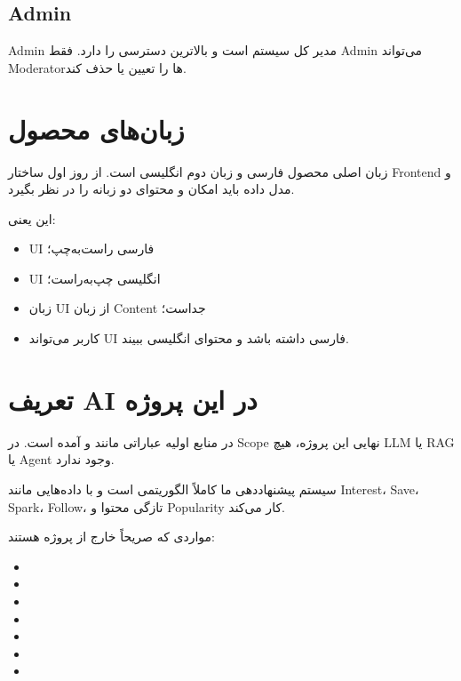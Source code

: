\subsection{Admin}

Admin مدیر کل سیستم است و بالاترین دسترسی را دارد. فقط Admin می‌تواند Moderatorها را تعیین یا حذف کند.

\section{زبان‌های محصول}

\begin{decisionbox}
زبان اصلی محصول فارسی و زبان دوم انگلیسی است. از روز اول ساختار Frontend و مدل داده باید امکان  و محتوای دو زبانه را در نظر بگیرد.
\end{decisionbox}

این یعنی:
\begin{itemize}
  \item UI فارسی راست‌به‌چپ؛
  \item UI انگلیسی چپ‌به‌راست؛
  \item زبان UI از زبان Content جداست؛
  \item کاربر می‌تواند UI فارسی داشته باشد و محتوای انگلیسی ببیند.
\end{itemize}

\section{تعریف AI در این پروژه}

\begin{warningbox}
در منابع اولیه عباراتی مانند  و  آمده است. در Scope نهایی این پروژه، هیچ LLM یا RAG یا Agent وجود ندارد.
\end{warningbox}

سیستم پیشنهاددهی ما کاملاً الگوریتمی است و با داده‌هایی مانند Interest، Save، Spark، Follow، تازگی محتوا و Popularity کار می‌کند.

مواردی که صریحاً خارج از پروژه هستند:
\begin{itemize}
  \item {}
  \item {}
  \item {}
  \item {}
  \item {}
  \item {}
  \item {}
\end{itemize}


